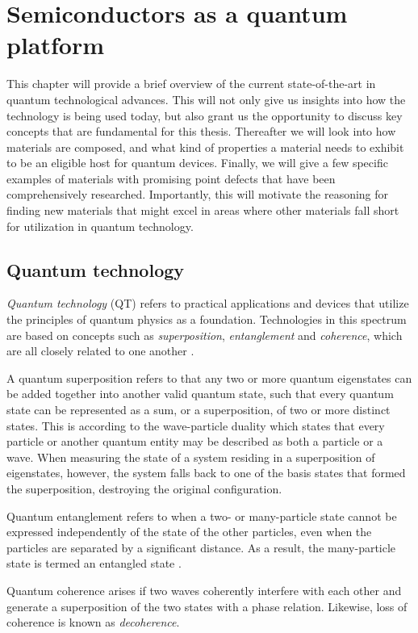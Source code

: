 \chapter{Semiconductors as a quantum platform}

This chapter will provide a brief overview of the current state-of-the-art in quantum technological advances. This will not only give us insights into how the technology is being used today, but also grant us the opportunity to discuss key concepts that are fundamental for this thesis. Thereafter we will look into how materials are composed, and what kind of properties a material needs to exhibit to be an eligible host for quantum devices. Finally, we will give a few specific examples of materials with promising point defects that have been comprehensively researched. Importantly, this will motivate the reasoning for finding new materials that might excel in areas where other materials fall short for utilization in quantum technology.

\section{Quantum technology}
\textit{Quantum technology} (QT) refers to practical applications and devices that utilize the principles of quantum physics as a foundation. Technologies in this spectrum are based on concepts such as \textit{superposition}, \textit{entanglement} and \textit{coherence}, which are all closely related to one another \cite{Acin2018, Griffiths2017}.

A quantum superposition refers to that any two or more quantum eigenstates can be added together into another valid quantum state, such that every quantum state can be represented as a sum, or a superposition, of two or more distinct states. This is according to the wave-particle duality which states that every particle or another quantum entity may be described as both a particle or a wave. When measuring the state of a system residing in a superposition of eigenstates, however, the system falls back to one of the basis states that formed the superposition, destroying the original configuration.

Quantum entanglement refers to when a two- or many-particle state cannot be expressed independently of the state of the other particles, even when the particles are separated by a significant distance. As a result, the many-particle state is termed an entangled state \cite{Griffiths2017}.

Quantum coherence arises if two waves coherently interfere with each other and generate a superposition of the two states with a phase relation. Likewise, loss of coherence is known as \textit{decoherence}.

